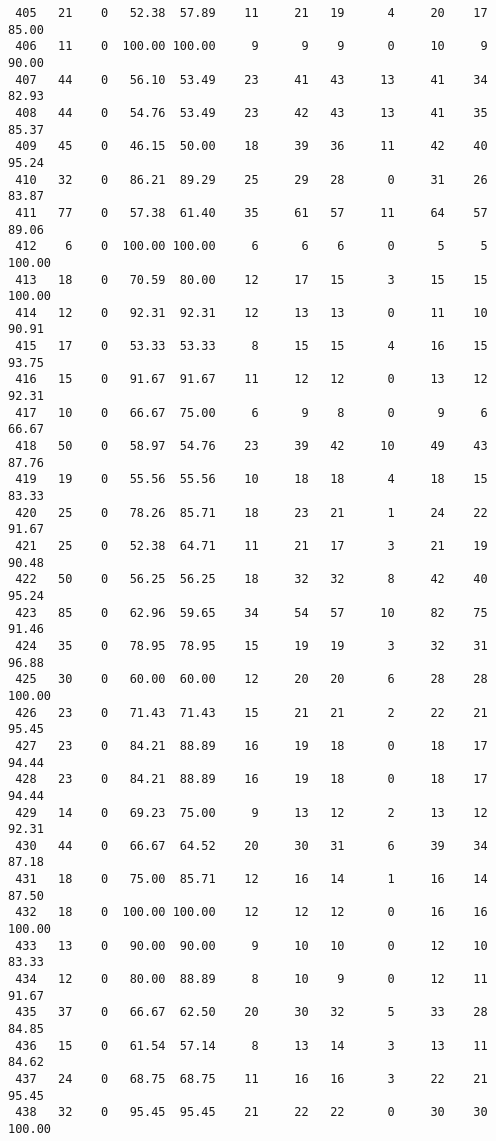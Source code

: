 \begin{verbatim}
 405   21    0   52.38  57.89    11     21   19      4     20    17    85.00
 406   11    0  100.00 100.00     9      9    9      0     10     9    90.00
 407   44    0   56.10  53.49    23     41   43     13     41    34    82.93
 408   44    0   54.76  53.49    23     42   43     13     41    35    85.37
 409   45    0   46.15  50.00    18     39   36     11     42    40    95.24
 410   32    0   86.21  89.29    25     29   28      0     31    26    83.87
 411   77    0   57.38  61.40    35     61   57     11     64    57    89.06
 412    6    0  100.00 100.00     6      6    6      0      5     5   100.00
 413   18    0   70.59  80.00    12     17   15      3     15    15   100.00
 414   12    0   92.31  92.31    12     13   13      0     11    10    90.91
 415   17    0   53.33  53.33     8     15   15      4     16    15    93.75
 416   15    0   91.67  91.67    11     12   12      0     13    12    92.31
 417   10    0   66.67  75.00     6      9    8      0      9     6    66.67
 418   50    0   58.97  54.76    23     39   42     10     49    43    87.76
 419   19    0   55.56  55.56    10     18   18      4     18    15    83.33
 420   25    0   78.26  85.71    18     23   21      1     24    22    91.67
 421   25    0   52.38  64.71    11     21   17      3     21    19    90.48
 422   50    0   56.25  56.25    18     32   32      8     42    40    95.24
 423   85    0   62.96  59.65    34     54   57     10     82    75    91.46
 424   35    0   78.95  78.95    15     19   19      3     32    31    96.88
 425   30    0   60.00  60.00    12     20   20      6     28    28   100.00
 426   23    0   71.43  71.43    15     21   21      2     22    21    95.45
 427   23    0   84.21  88.89    16     19   18      0     18    17    94.44
 428   23    0   84.21  88.89    16     19   18      0     18    17    94.44
 429   14    0   69.23  75.00     9     13   12      2     13    12    92.31
 430   44    0   66.67  64.52    20     30   31      6     39    34    87.18
 431   18    0   75.00  85.71    12     16   14      1     16    14    87.50
 432   18    0  100.00 100.00    12     12   12      0     16    16   100.00
 433   13    0   90.00  90.00     9     10   10      0     12    10    83.33
 434   12    0   80.00  88.89     8     10    9      0     12    11    91.67
 435   37    0   66.67  62.50    20     30   32      5     33    28    84.85
 436   15    0   61.54  57.14     8     13   14      3     13    11    84.62
 437   24    0   68.75  68.75    11     16   16      3     22    21    95.45
 438   32    0   95.45  95.45    21     22   22      0     30    30   100.00

\end{verbatim}
